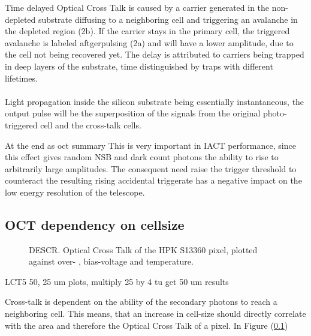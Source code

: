 \documentclass[article,type=msc,colorback,accentcolor=tud9c]{tudthesis}
\begin{document}
Time delayed Optical Cross Talk is caused by a carrier generated in the non-depleted substrate diffusing to a neighboring cell and triggering an avalanche in the depleted region (2b). If the carrier stays in the primary cell, the triggered avalanche is labeled aftgerpulsing (2a) and will have a lower amplitude, due to the cell not being recovered yet. The delay is attributed to carriers being trapped in deep layers of the substrate, time distinguished by traps with different lifetimes.\\\\

Light propagation inside the silicon substrate being essentially instantaneous, the output pulse will be the superposition of the signals from the original photo-triggered cell and the cross-talk cells.



At the end as oct summary
This is very important in IACT performance, since this effect gives random NSB and dark count photons the ability to rise to arbitrarily large amplitudes. The consequent need raise the trigger threshold to counteract the resulting rising accidental triggerate has a negative impact on the low energy resolution of the telescope. 


\subsection{OCT dependency on cellsize}
\begin{figure}[h]
\begin{centering}
\caption{DESCR. Optical Cross Talk of the HPK S13360 pixel, plotted against over- , bias-voltage and temperature. }
\label{fig:}
\end{centering}
\end{figure}
LCT5 50, 25 um plots, multiply 25 by 4 tu get 50 um results

Cross-talk is dependent on the ability of the secondary photons to reach a neighboring cell. This means, that an increase in cell-size should directly correlate with the area and therefore the Optical Cross Talk of a pixel. In Figure (\ref{})



\newpage
\end{document}
